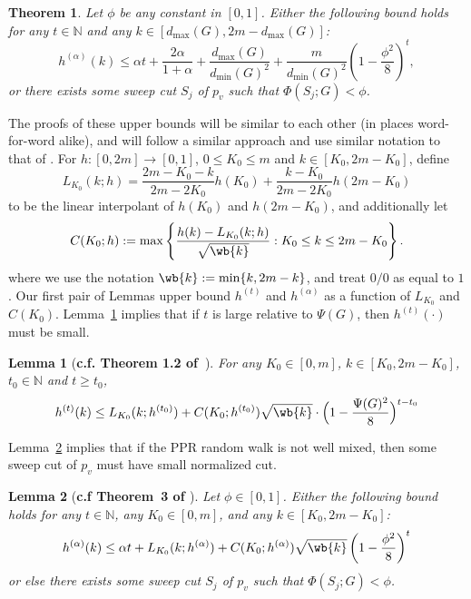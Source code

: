 \documentclass{article}
\newcommand{\set}[1]{\left\{#1\right\}}
\newcommand{\1}{\mathbf{1}}
\newtheorem{theorem}{Theorem}[section]
\newtheorem{lemma}{Lemma}[section]
\theoremstyle{definition}
\theoremstyle{remark}
\begin{document}
\begin{theorem}
	\label{thm:mixing_time_PPR}
	Let $\phi$ be any constant in $[0,1]$. Either the following bound holds for any $t \in \mathbb{N}$ and any $k \in [d_{\max}(G),2m - d_{\max}(G)]$:
	\begin{equation*}
	h^{(\alpha)}(k) \leq \alpha t + \frac{2\alpha}{1 + \alpha} + \frac{d_{\max}(G)}{d_{\min}(G)^2} + \frac{m}{d_{\min}(G)^2} \left(1 - \frac{\phi^2}{8}\right)^{t},
	\end{equation*}
	or there exists some sweep cut $S_j$ of $p_v$ such that $\Phi(S_j;G) < \phi$.
\end{theorem}

The proofs of these upper bounds will be similar to each other (in places word-for-word alike), and will follow a similar approach and use similar notation to that of \citep{lovasz1990,andersen2006}. For $h: [0,2m] \to [0,1]$, $0 \leq K_0 \leq m$ and $k \in [K_0,2m - K_0]$, define
\begin{equation*}
L_{K_0}(k;h) = \frac{2m - K_0 - k}{2m - 2K_0}h(K_0) + \frac{k - K_0}{2m - 2K_0}h(2m - K_0)
\end{equation*}
to be the linear interpolant of $h(K_0)$ and $h(2m - K_0)$, and additionally let
\begin{equation*}
C(K_0;h) := \max\set{\frac{h(k) - L_{K_0}(k;h)}{\sqrt{\wb{k}}}: K_0 \leq k \leq  2m - K_0}.
\end{equation*}
where we use the notation $\wb{k} := \min\{k, 2m - k\}$, and treat $0/0$ as equal to $1$. Our first pair of Lemmas upper bound $h^{(t)}$ and $h^{(\alpha)}$ as a function of $L_{K_0}$ and $C(K_0)$. Lemma~\ref{lem:mixing_random_walk} implies that if $t$ is large relative to $\Psi(G)$, then $h^{(t)}(\cdot)$ must be small.

\begin{lemma}[\textbf{c.f. Theorem 1.2 of~\citep{lovasz1990}}]
	\label{lem:mixing_random_walk}
	For any $K_0 \in [0,m]$, $k \in [K_0, 2m - K_0]$, $t_0 \in \mathbb{N}$ and $t \geq t_0$,
	\begin{equation}
	\label{eqn:mixing_random_walk}
	h^{(t)}(k) \leq L_{K_0}(k;h^{(t_0)}) + C(K_0; h^{(t_0)}) \sqrt{\wb{k}} \cdot \Bigl(1 - \frac{\Psi(G)^2}{8}\Bigr)^{t - t_0}
	\end{equation}
\end{lemma}

Lemma~\ref{lem:mixing_time_PPR} implies that if the PPR random walk is not well mixed, then some sweep cut of $p_v$ must have small normalized cut.

\begin{lemma}[\textbf{c.f Theorem~3 of \citep{andersen2006}}]
	\label{lem:mixing_time_PPR}
	Let $\phi \in [0,1]$. Either the following bound holds for any $t \in \mathbb{N}$, any $K_0 \in [0,m]$, and any $k \in [K_0,2m - K_0]$:
	\begin{equation}
	\label{eqn:mixing_time_PPR}
	h^{(\alpha)}(k) \leq \alpha t + L_{K_0}(k; h^{(\alpha)}) + C(K_0;h^{(\alpha)})\sqrt{\wb{k}}\left(1 - \frac{\phi^2}{8}\right)^t
	\end{equation}
	or else there exists some sweep cut $S_{j}$ of $p_v$ such that $\Phi(S_j;G) < \phi$.
\end{lemma}
\end{document}
